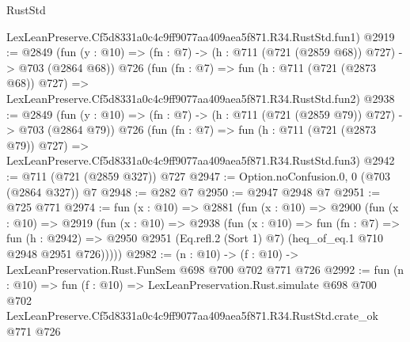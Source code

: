\begin{lexlean}{RustStd}
\begin{coremodule}
    LexLeanPreserve.Cf5d8331a0c4c9ff9077aa409aea5f871.R34.RustStd.fun1)
@2919 := @2849
    (fun (y : @10) => (fn : @7) -> (h : @711 (@721 (@2859 @68)) @727) -> @703 (@2864 @68))
    @726
    (fun (fn : @7) =>
    fun (h : @711 (@721 (@2873 @68)) @727) =>
    LexLeanPreserve.Cf5d8331a0c4c9ff9077aa409aea5f871.R34.RustStd.fun2)
@2938 := @2849
    (fun (y : @10) => (fn : @7) -> (h : @711 (@721 (@2859 @79)) @727) -> @703 (@2864 @79))
    @726
    (fun (fn : @7) =>
    fun (h : @711 (@721 (@2873 @79)) @727) =>
    LexLeanPreserve.Cf5d8331a0c4c9ff9077aa409aea5f871.R34.RustStd.fun3)
@2942 := @711 (@721 (@2859 @327)) @727
@2947 := Option.noConfusion.{0, 0} (@703 (@2864 @327)) @7
@2948 := @282 @7
@2950 := @2947 @2948 @7
@2951 := @725 @771
@2974 := fun (x : @10) =>
  @2881
    (fun (x : @10) =>
    @2900
      (fun (x : @10) =>
      @2919
        (fun (x : @10) =>
        @2938
          (fun (x : @10) =>
          fun (fn : @7) =>
          fun (h : @2942) =>
          @2950 @2951 (Eq.refl.{2} (Sort 1) @7) (heq_of_eq.{1} @710 @2948 @2951 @726)))))
@2982 := (n : @10) -> (f : @10) -> LexLeanPreservation.Rust.FunSem @698 @700 @702 @771 @726
@2992 := fun (n : @10) =>
  fun (f : @10) =>
  LexLeanPreservation.Rust.simulate
    @698
    @700
    @702
    LexLeanPreserve.Cf5d8331a0c4c9ff9077aa409aea5f871.R34.RustStd.crate_ok
    @771
    @726
\end{coremodule}
\end{lexlean}
